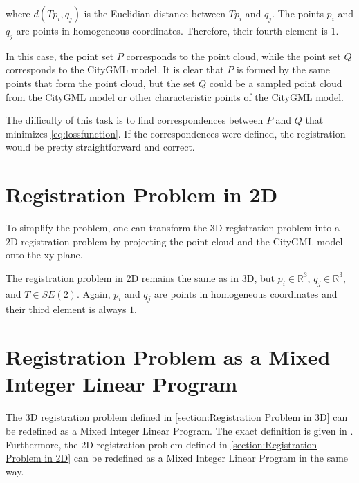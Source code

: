         where $d(T p_i, q_j)$ is the Euclidian distance between $T p_i$ and $q_j$.
        The points $p_i$ and $q_j$ are points in homogeneous coordinates. Therefore, their fourth element is $1$.

        In this case, the point set $P$ corresponds to the point cloud, while the point set $Q$ corresponds to the CityGML model.
        It is clear that $P$ is formed by the same points that form the point cloud, 
        but the set $Q$ could be a sampled point cloud from the CityGML model
        or other characteristic points of the CityGML model.
        
        The difficulty of this task is to find correspondences between $P$ and $Q$ that minimizes \autoref{eq:lossfunction}.
        If the correspondences were defined, the registration would be pretty straightforward and correct.

    \section{Registration Problem in 2D}
    \label{section:Registration Problem in 2D}
        To simplify the problem, one can transform the 3D registration problem into a 2D registration problem 
        by projecting the point cloud and the CityGML model onto the xy-plane.

        The registration problem in 2D remains the same as in 3D, but $p_i \in \mathbb{R}^{3}$, $q_j \in \mathbb {R}^{3}$, and $T \in SE(2)$.
        Again, $p_i$ and $q_j$ are points in homogeneous coordinates and their third element is always $1$.

    \section{Registration Problem as a Mixed Integer Linear Program}
    \label{section:Registration Problem as Mixed Integer Linear Program}
        The 3D registration problem defined in \autoref{section:Registration Problem in 3D} can be redefined as a Mixed Integer Linear Program.
        The exact definition is given in \cite{Sakakubara_2007_automatic}. Furthermore, the 2D registration problem defined in \autoref{section:Registration Problem in 2D}
        can be redefined as a Mixed Integer Linear Program in the same way.
        
